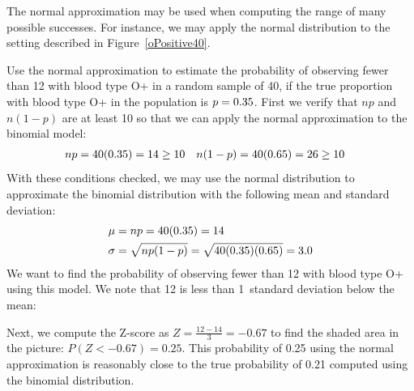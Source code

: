 The normal approximation may be used when computing the range of many possible successes. For instance, we may apply the normal distribution to the setting described in Figure~\ref{oPositive40}.


\begin{examplewrap}
\begin{nexample}{Use the normal approximation to estimate the probability of observing fewer than 12 with blood type O+ in a random sample of 40, if the true proportion with blood type O+ in the population is $p=0.35{}$.}
\label{approxBinomialForN40P35OPosExample}%
First we verify that $np$ and $n(1-p)$ are at least 10 so that we can apply the normal approximation to the binomial model:
\begin{align*}
np& = 40(0.35{})=14\ge 10
&
n(1-p)& = 40(0.65{}) = 26\ge 10
\end{align*}
With these conditions checked, we may use the normal distribution to approximate the binomial distribution with the following mean and standard deviation:
\begin{align*}
\mu &= np = 40(0.35{})=14\\
\sigma &= \sqrt{np(1-p)} = \sqrt{40(0.35{})(0.65{})} = 3.0
\end{align*}
We want to find the probability of observing fewer than 12 with blood type O+ using this model. We note that 12 is less than 1~standard deviation below the mean:
\begin{center}
\end{center}
Next, we compute the Z-score as $Z=\frac{12 - 14}{3} = -0.67$ to find the shaded area in the picture: $P(Z < -0.67) = 0.25$. This probability of 0.25 using the normal approximation is reasonably close to the true probability of 0.21 computed using the binomial distribution.
\end{nexample}
\end{examplewrap}



